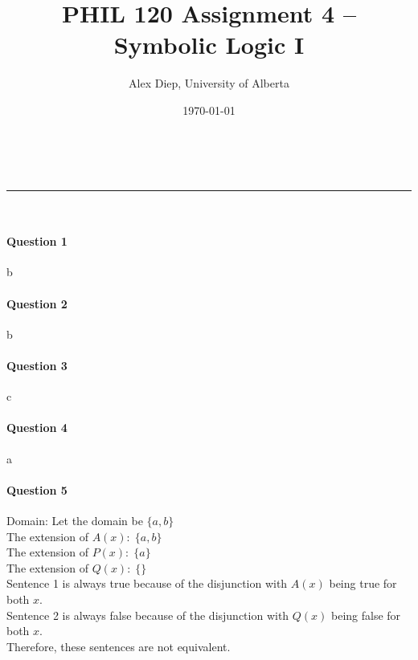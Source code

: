 \documentclass[letterpaper,11pt]{article}
\makeatletter
\newcommand{\linia}{\rule{\linewidth}{0.5pt}}
\theoremstyle{mytheor}
\renewcommand{\maketitle}{
\begin{center}
\vspace{2ex}
{\huge \textsc{\@title}}
\vspace{1ex}
\\
\linia\\
\@author \hfill \@date
\vspace{4ex}
\end{center}
}
\makeatother
\begin{document}
\title{PHIL 120 Assignment 4 -- Symbolic Logic I}

\author{Alex Diep, University of Alberta}

\date{\today}

\maketitle
\paragraph{Question 1}\phantom{a}

\begin{framed}
b
\end{framed}

\paragraph{Question 2}\phantom{a}
\begin{framed}
    b
\end{framed}

\paragraph{Question 3}\phantom{a}
\begin{framed}
    c
\end{framed}

\paragraph{Question 4}\phantom{a}
\begin{framed}
    a
\end{framed}

\paragraph{Question 5}\phantom{a}
\begin{framed}
    \noindent Domain: Let the domain be $\{a, b\}$ \\

    \noindent The extension of $A(x): \; \{a, b\}$ \\
    The extension of $P(x): \; \{a\}$ \\
    The extension of $Q(x): \; \{\}$ \\
    
    \noindent Sentence 1 is always true because of the disjunction with $A(x)$ being true for both $x$.\\
    Sentence 2 is always false because of the disjunction with $Q(x)$ being false for both $x$.\\

    \noindent Therefore, these sentences are not equivalent.
\end{framed}
\end{document}
